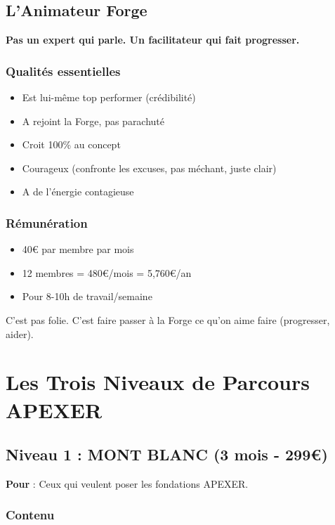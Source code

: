 \documentclass[12pt,a4paper,openany]{book}
\begin{document}
\section{L'Animateur Forge}

\textbf{Pas un expert qui parle. Un facilitateur qui fait progresser.}

\subsection{Qualités essentielles}

\begin{itemize}
\item Est lui-même top performer (crédibilité)
\item A rejoint la Forge, pas parachuté
\item Croit 100\% au concept
\item Courageux (confronte les excuses, pas méchant, juste clair)
\item A de l'énergie contagieuse
\end{itemize}

\subsection{Rémunération}

\begin{itemize}
\item 40\euro{} par membre par mois
\item 12 membres = 480\euro{}/mois = 5,760\euro{}/an
\item Pour 8-10h de travail/semaine
\end{itemize}

C'est pas folie. C'est faire passer à la Forge ce qu'on aime faire (progresser, aider).

\clearpage

\chapter{Les Trois Niveaux de Parcours APEXER}

\section{Niveau 1 : MONT BLANC (3 mois - 299\euro{})}

\textbf{Pour} : Ceux qui veulent poser les fondations APEXER.

\subsection{Contenu}
\end{document}
